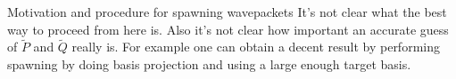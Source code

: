 \begin{chapter}{Motivation and procedure for spawning wavepackets}
It's not clear what the best way to proceed from here is. Also it's not clear how
important an accurate guess of $\tilde{P}$ and $\tilde{Q}$ really is. For example
one can obtain a decent result by performing spawning by doing basis projection
and using a large enough target basis.

\end{chapter}
